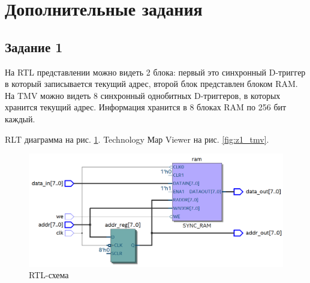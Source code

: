 \documentclass[a4paper,14pt]{article}
\begin{document}
	\section{Дополнительные задания}
	
	\subsection{Задание 1}
	
	На RTL представлении можно видеть 2 блока: первый это синхронный D-триггер в который записывается текущий адрес, второй блок представлен блоком RAM. На TMV можно видеть 8 синхронный однобитных D-триггеров, в которых хранится текущий адрес. Информация хранится в 8 блоках RAM по 256 бит каждый.
	
	RLT диаграмма на рис. \ref{fig:z1_rtl}. Technology Мар Viewer на рис. \ref{fig:z1_tmv}.
	 
	\begin{figure}[H]
		\centering
		\includegraphics[width=\linewidth]{images/z1_rtl}
		\caption{RTL-схема}
		\label{fig:z1_rtl}
	\end{figure}
\end{document}
